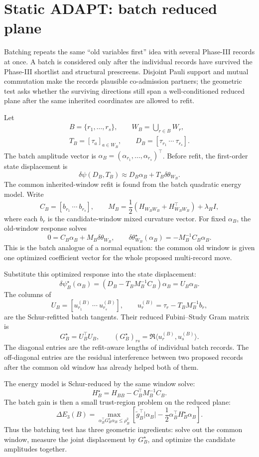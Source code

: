 \documentclass[10pt,twocolumn]{article}
\begin{document}
\section{Static ADAPT: batch reduced plane}

Batching repeats the same ``old variables first'' idea with several Phase-III
records at once.  A batch is considered only after the individual records have
survived the Phase-III shortlist and structural prescreens.  Disjoint Pauli
support and mutual commutation make the records plausible co-admission
partners; the geometric test asks whether the surviving directions still span a
well-conditioned reduced plane after the same inherited coordinates are allowed
to refit.

Let
\[
\begin{gathered}
B=\{r_1,\ldots,r_s\},
\qquad
W_B=\bigcup_{r\in B}W_r,\\
T_B=[\tau_a]_{a\in W_B},
\qquad
D_B=[\tau_{r_1}\ \cdots\ \tau_{r_s}].
\end{gathered}
\]
The batch amplitude vector is
\(\alpha_B=(\alpha_{r_1},\ldots,\alpha_{r_s})^\top\).  Before refit, the
first-order state displacement is
\[
\delta\psi(D_B,T_B)
\approx D_B\alpha_B+T_B\delta\theta_{W_B}.
\]
The common inherited-window refit is found from the batch quadratic energy
model.  Write
\[
C_B=[b_{r_1}\ \cdots\ b_{r_s}],
\qquad
M_B=\frac12(H_{W_BW_B}+H_{W_BW_B}^\top)+\lambda_HI,
\]
where each \(b_r\) is the candidate-window mixed curvature vector.  For fixed
\(\alpha_B\), the old-window response solves
\[
0=C_B\alpha_B+M_B\delta\theta_{W_B},
\qquad
\delta\theta_{W_B}^\star(\alpha_B)
=-M_B^{-1}C_B\alpha_B.
\]
This is the batch analogue of a normal equation: the common old window is given
one optimized coefficient vector for the whole proposed multi-record move.

Substitute this optimized response into the state displacement:
\[
\delta\psi^\star_B(\alpha_B)
=\left(D_B-T_BM_B^{-1}C_B\right)\alpha_B
 =U_B\alpha_B.
\]
The columns of
\[
U_B=[u_{r_1}^{(B)}\ \cdots\ u_{r_s}^{(B)}],
\qquad
u_r^{(B)}=\tau_r-T_BM_B^{-1}b_r,
\]
are the Schur-refitted batch tangents.  Their reduced Fubini--Study Gram matrix
is
\[
G_B^\star=U_B^\top U_B,\qquad
(G_B^\star)_{rs}=\Re\langle u_r^{(B)},u_s^{(B)}\rangle.
\]
The diagonal entries are the refit-aware lengths of individual batch records.
The off-diagonal entries are the residual interference between two proposed
records after the common old window has already helped both of them.

The energy model is Schur-reduced by the same window solve:
\[
H_B^\star
=H_{BB}-C_B^\top M_B^{-1}C_B.
\]
The batch gain is then a small trust-region problem on the reduced plane:
\[
\boxed{
\Delta E_3(B)
=
\max_{\alpha_B^\top G_B^\star\alpha_B\le\rho_B^2}
\left[
\widetilde g_B^\top|\alpha_B|
-\frac12\alpha_B^\top H_B^\star\alpha_B
\right].
}
\]
Thus the batching test has three geometric ingredients: solve out the common
window, measure the joint displacement by \(G_B^\star\), and optimize the
candidate amplitudes together.
\end{document}
